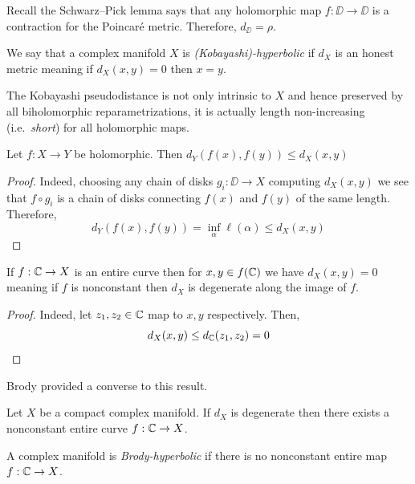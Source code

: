 \documentclass[main.tex]{subfiles}
\begin{document}
\begin{example}
Recall the Schwarz--Pick lemma says that any holomorphic map $f : \DD \to \DD$ is a contraction for the Poincar\'{e} metric. Therefore, $d_{\DD} = \rho$.
\end{example}

\begin{defn}
We say that a complex manifold $X$ is \textit{(Kobayashi)-hyperbolic} if $d_X$ is an honest metric meaning if $d_X(x,y) = 0$ then $x = y$. 
\end{defn}

The Kobayashi pseudodistance is not only intrinsic to $X$ and hence preserved by all biholomorphic reparametrizations, it is actually length non-increasing (i.e.\ \textit{short}) for all holomorphic maps.

\begin{lemma}
Let $f : X \to Y$ be holomorphic. Then $d_Y(f(x), f(y)) \le d_X(x,y)$
\end{lemma}

\begin{proof}
Indeed, choosing any chain of disks $g_i : \DD \to X$ computing $d_X(x,y)$ we see that $f \circ g_i$ is a chain of disks connecting $f(x)$ and $f(y)$ of the same length. Therefore,
\[ d_Y(f(x), f(y)) = \inf_{\alpha} \ell(\alpha) \le d_X(x, y) \]
\end{proof}

\begin{cor}
If $f : \mathbb{C} \to X$ is an entire curve then for $x, y \in f(\mathbb{C})$ we have $d_X(x,y) = 0$ meaning if $f$ is nonconstant then $d_X$ is degenerate along the image of $f$.
\end{cor}

\begin{proof}
Indeed, let $z_1, z_2 \in \mathbb{C}$ map to $x,y$ respectively. Then,
\[ d_X(x,y) \le d_{\mathbb{C}}(z_1, z_2) = 0 \]
\end{proof}

Brody provided a converse to this result. 

\begin{theorem}[Brody]
Let $X$ be a compact complex manifold. If $d_X$ is degenerate then there exists a nonconstant entire curve $f : \mathbb{C} \to X$. 
\end{theorem}

\begin{defn}
A complex manifold is \textit{Brody-hyperbolic} if there is no nonconstant entire map $f : \mathbb{C} \to X$.
\end{defn}
\end{document}

